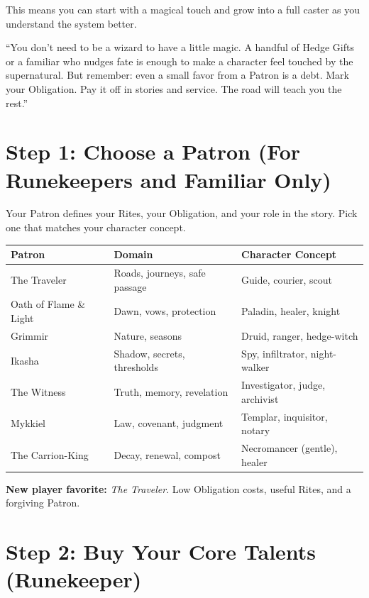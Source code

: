 This means you can start with a magical touch and grow into a full caster as you understand the system better.

\begin{tcolorbox}[colback=blue!5!white,colframe=blue!75!black,title=The Gray Wanderer's Advice,breakable]
``You don't need to be a wizard to have a little magic. A handful of Hedge Gifts or a familiar who nudges fate is enough to make a character feel touched by the supernatural. But remember: even a small favor from a Patron is a debt. Mark your Obligation. Pay it off in stories and service. The road will teach you the rest.''
\end{tcolorbox}

\section{Step 1: Choose a Patron (For Runekeepers and Familiar Only)}

Your Patron defines your Rites, your Obligation, and your role in the story. Pick one that matches your character concept.

\begin{center}
\small
\renewcommand{\arraystretch}{1.2}
\begin{tabular}{lll}
\toprule
\textbf{Patron} & \textbf{Domain} & \textbf{Character Concept} \\
\midrule
The Traveler & Roads, journeys, safe passage & Guide, courier, scout \\
Oath of Flame \& Light & Dawn, vows, protection & Paladin, healer, knight \\
Grimmir & Nature, seasons & Druid, ranger, hedge-witch \\
Ikasha & Shadow, secrets, thresholds & Spy, infiltrator, night-walker \\
The Witness & Truth, memory, revelation & Investigator, judge, archivist \\
Mykkiel & Law, covenant, judgment & Templar, inquisitor, notary \\
The Carrion-King & Decay, renewal, compost & Necromancer (gentle), healer \\
\bottomrule
\end{tabular}
\end{center}

\textbf{New player favorite:} \emph{The Traveler}. Low Obligation costs, useful Rites, and a forgiving Patron.

\section{Step 2: Buy Your Core Talents (Runekeeper)}

